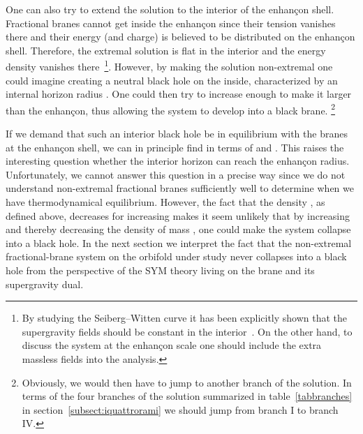\documentclass[a4paper,11pt]{article}
\begin{document}
One can also try to extend the solution to the interior of the
enhan\c{c}on shell. Fractional branes cannot get inside the
enhan\c{c}on since their tension vanishes there and their energy
(and charge) is believed to be distributed on the enhan\c{c}on shell.
Therefore, the extremal solution is flat in the interior and the energy
density vanishes
there~\cite{Johnson:1999qt,Merlatti:2001gd}\footnote{By studying the
Seiberg--Witten curve it has been explicitly shown that the
supergravity fields should be constant in the
interior~\cite{Petrini:2001fk}. On the other hand, to discuss the
system at the enhan\c{c}on scale one should include the extra massless
fields into the analysis.}. However, by making the solution
non-extremal one could imagine creating a neutral black hole on the
inside, characterized by an internal horizon radius \coordHE{}. One could
then try to increase \coordHE{} enough to make it larger than the
enhan\c{c}on, thus allowing the system to develop into a black brane.%
\footnote{Obviously, we would then have to jump to another branch of
the solution. In terms of the four branches of the solution summarized
in table~\ref{tabbranches} in section~\ref{subsect:iquattrorami} we
should jump from branch I to branch IV.}

If we demand that such an interior black hole be in equilibrium with
the branes at the enhan\c{c}on shell, we can in principle find \coordHE{}
in terms of \coordHE{} and \coordHE{}. This raises the interesting question
whether the interior horizon can reach the enhan\c{c}on
radius. Unfortunately, we cannot answer this question in a precise way
since we do not understand non-extremal fractional branes sufficiently
well to determine when we have thermodynamical equilibrium. However,
the fact that the density \coordHE{}, as defined above, decreases
for increasing \coordHE{} makes it seem unlikely that by increasing \coordHE{}
and thereby decreasing the density of mass \coordHE{}, one could
make the system collapse into a black hole. In the next section we
interpret the fact that the non-extremal fractional-brane system on
the orbifold under study never collapses into a black hole from the
perspective of the SYM theory living on the brane and its supergravity
dual.
\end{document}
